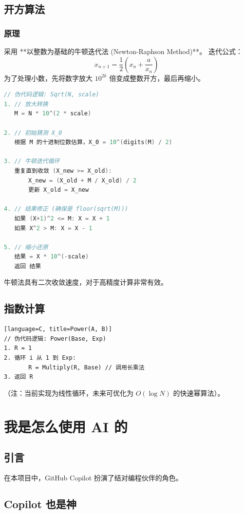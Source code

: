 \documentclass[UTF8]{ctexart}
\begin{document}
\subsection{开方算法}
\subsubsection{原理}
采用 **以整数为基础的牛顿迭代法 (Newton-Raphson Method)**。
迭代公式：
$$ x_{n+1} = \frac{1}{2} (x_n + \frac{a}{x_n}) $$
为了处理小数，先将数字放大 $10^{2k}$ 倍变成整数开方，最后再缩小。

\begin{lstlisting}[language=C, title=Sqrt(N)]
// 伪代码逻辑: Sqrt(N, scale)
1. // 放大转换
   M = N * 10^(2 * scale)
   
2. // 初始猜测 X_0
   根据 M 的十进制位数估算，X_0 = 10^(digits(M) / 2)

3. // 牛顿迭代循环
   重复直到收敛 (X_new >= X_old):
       X_new = (X_old + M / X_old) / 2
       更新 X_old = X_new

4. // 结果修正 (确保是 floor(sqrt(M)))
   如果 (X+1)^2 <= M: X = X + 1
   如果 X^2 > M: X = X - 1

5. // 缩小还原
   结果 = X * 10^(-scale)
   返回 结果
\end{lstlisting}
牛顿法具有二次收敛速度，对于高精度计算非常有效。

\subsection{指数计算}
\begin{lstlisting}[language=C, title=Power(A, B)]
// 伪代码逻辑: Power(Base, Exp)
1. R = 1
2. 循环 i 从 1 到 Exp:
       R = Multiply(R, Base) // 调用长乘法
3. 返回 R
\end{lstlisting}
（注：当前实现为线性循环，未来可优化为 $O(\log N)$ 的快速幂算法）。

\section{我是怎么使用 AI 的}

\subsection{引言}
在本项目中，GitHub Copilot 扮演了结对编程伙伴的角色。

\subsection{Copilot 也是神}
\end{document}
